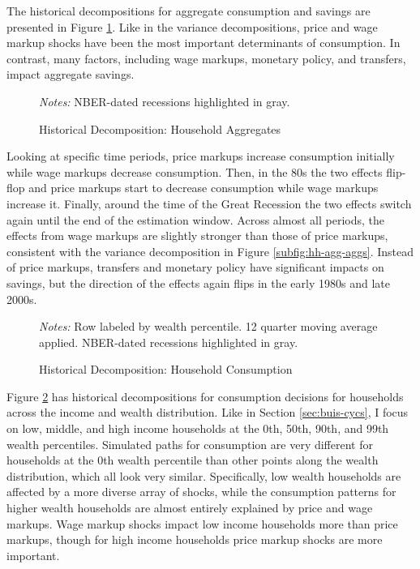 The historical decompositions for aggregate consumption and savings are presented in Figure \ref{fig:agg-hist-decomp}. Like in the variance decompositions, price and wage markup shocks have been the most important determinants of consumption. In contrast, many factors, including wage markups, monetary policy, and transfers, impact aggregate savings.

\begin{figure}[t]
    \centering
    \caption{Historical Decomposition: Household Aggregates}
    

    {\scriptsize \emph{Notes:} NBER-dated recessions highlighted in gray.}
    \label{fig:agg-hist-decomp}
\end{figure}

Looking at specific time periods, price markups increase consumption initially while wage markups decrease consumption. Then, in the 80s the two effects flip-flop and price markups start to decrease consumption while wage markups increase it. Finally, around the time of the Great Recession the two effects switch again until the end of the estimation window. Across almost all periods, the effects from wage markups are slightly stronger than those of price markups, consistent with the variance decomposition in Figure \ref{subfig:hh-agg-aggs}. Instead of price markups, transfers and monetary policy have significant impacts on savings, but the direction of the effects again flips in the early 1980s and late 2000s.

\begin{figure}[t!]
    \centering
    \caption{Historical Decomposition: Household Consumption}
    
    {\scriptsize \emph{Notes:} Row labeled by wealth percentile. 12 quarter moving average applied. NBER-dated recessions highlighted in gray.}
    \label{fig:cons-hist-decomp}
\end{figure}

Figure \ref{fig:cons-hist-decomp} has historical decompositions for consumption decisions for households across the income and wealth distribution. Like in Section \ref{sec:buis-cycs}, I focus on low, middle, and high income households at the 0th, 50th, 90th, and 99th wealth percentiles. Simulated paths for consumption are very different for households at the 0th wealth percentile than other points along the wealth distribution, which all look very similar. Specifically, low wealth households are affected by a more diverse array of shocks, while the consumption patterns for higher wealth households are almost entirely explained by price and wage markups. Wage markup shocks impact low income households more than price markups, though for high income households price markup shocks are more important.

